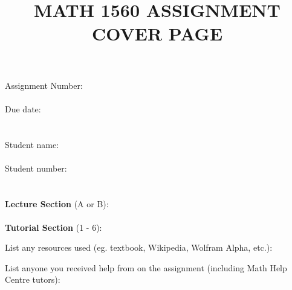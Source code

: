 \documentclass[12pt,letterpaper]{article}
\title{MATH 1560 ASSIGNMENT COVER PAGE}
\date{}
\begin{document}
\maketitle
\large
\begin{tabbing}
Assignment Number: \= \underline{\hspace{1in}}  \=\\
\\
Due date: \> \underline{\hspace{4in}}\\
\\
\\
Student name: \> \underline{\hspace{4in}}\\
\\
Student number: \> \underline{\hspace{4in}}\\
\\
\\
\textbf{Lecture Section} (A or B):\> \> \underline{\hspace{1in}}\\
\\
\textbf{Tutorial Section} (1 - 6): \> \> \underline{\hspace{1in}}
\end{tabbing}




\vspace{0.3in}

\noindent List any resources used (eg. textbook, Wikipedia, Wolfram Alpha, etc.):

\vspace{1.25in}

\noindent List anyone you received help from on the assignment (including Math Help Centre tutors):
\end{document}
